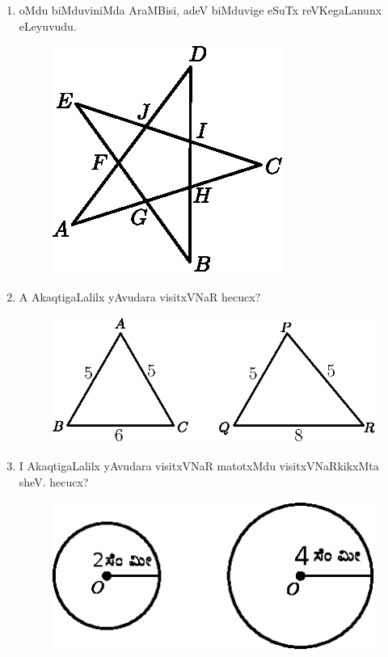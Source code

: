 \begin{enumerate}
\eject

\item oMdu biMduviniMda AraMBisi, adeV biMduvige eSuTx reVKegaLanunx eLeyuvudu.
\begin{figure}[H]
\centering
\includegraphics{src/figures/exr45.eps}
\end{figure}

\item A AkaqtigaLalilx yAvudara visitxVNaR hecucx?
\begin{figure}[H]
\centering
\includegraphics{src/figures/exr46.eps}
\end{figure}

\item I AkaqtigaLalilx yAvudara visitxVNaR matotxMdu visitxVNaRkikxMta sheV. hecucx?
\begin{figure}[H]
\centering
\includegraphics{src/figures/exr47.eps}
\end{figure}

\end{enumerate}
